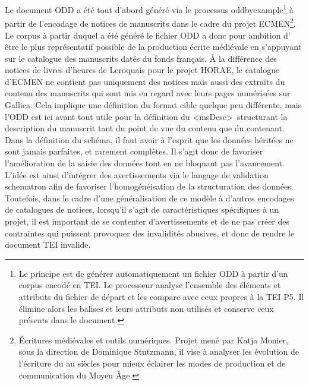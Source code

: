 \documentclass[a4paper,12pt,twoside]{book}
\begin{document}
	Le document ODD a été tout d'abord généré via le processus oddbyexample\footnote{Le principe est de générer automatiquement un fichier ODD à partir d'un corpus encodé en TEI. Le processeur analyse l'ensemble des éléments et attributs du fichier de départ et les compare avec ceux propres à la TEI P5. Il élimine alors les balises et leurs attributs non utilisés et conserve ceux présents dans le document.} à partir de l'encodage de notices de manuscrits dans le cadre du projet ECMEN\footnote{Écritures médiévales et outils numériques. Projet mené par Katja Monier, sous la direction de Dominique Stutzmann, il vise à analyser les évolution de l'écriture du  au  siècles pour mieux éclairer les modes de production et de communication du Moyen Âge.}. Le corpus à partir duquel a été généré le fichier ODD a donc pour ambition d' être le plus représentatif possible de la production écrite médiévale en s'appuyant sur le catalogue des manuscrits datés du fonds français. À la différence des notices de livres d'heures de Leroquais pour le projet HORAE, le catalogue d'ECMEN ne contient pas uniquement des notices mais aussi des extraits du contenu des manuscrits qui sont mis en regard avec leurs pages numérisées sur Gallica. Cela implique une définition du format cible quelque peu différente, mais l'ODD est ici avant tout utile pour la définition du \textless msDesc\textgreater~structurant la description du manuscrit tant du point de vue du contenu que du contenant. \\
	
	Dans la définition du schéma, il faut avoir à l'esprit que les données héritées ne sont jamais parfaites, et rarement complètes. Il s'agit donc de favoriser l'amélioration de la saisie des données tout en ne bloquant pas l'avancement. L'idée est ainsi d'intégrer des avertissements via le langage de validation schematron afin de favoriser l'homogénéisation de la structuration des données. Toutefois, dans le cadre d'une généralisation de ce modèle à d'autres encodages de catalogues de notices, lorsqu'il s'agit de caractéristiques spécifiques à un projet, il est important de se contenter d'avertissements et de ne pas créer des contraintes qui puissent provoquer des invalidités abusives, et donc de rendre le document TEI invalide.
	
\end{document}
